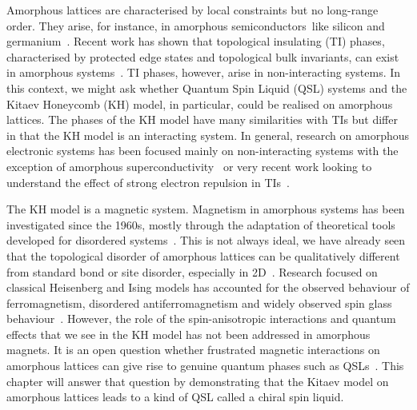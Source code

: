 Amorphous lattices are characterised by local constraints but no long-range order. They arise, for instance, in amorphous semiconductors~like silicon and germanium~\autocite{Yonezawa1983,zallen2008physics}. Recent work has shown that topological insulating (TI) phases, characterised by protected edge states and topological bulk invariants, can exist in amorphous systems~\autocite{mitchellAmorphousTopologicalInsulators2018,agarwala2019topological,marsalTopologicalWeaireThorpeModels2020,costa2019toward,agarwala2020higher,spring2021amorphous,corbae2019evidence}. TI phases, however, arise in non-interacting systems. In this context, we might ask whether Quantum Spin Liquid (QSL) systems and the Kitaev Honeycomb (KH) model, in particular, could be realised on amorphous lattices. The phases of the KH model have many similarities with TIs but differ in that the KH model is an interacting system. In general, research on amorphous electronic systems has been focused mainly on non-interacting systems with the exception of amorphous superconductivity~\autocite{buckel1954einfluss,mcmillan1981electron,meisel1981eliashberg,bergmann1976amorphous,mannaNoncrystallineTopologicalSuperconductors2022} or very recent work looking to understand the effect of strong electron repulsion in TIs~\autocite{kim2022fractionalization}.

The KH model is a magnetic system. Magnetism in amorphous systems has been investigated since the 1960s, mostly through the adaptation of theoretical tools developed for disordered systems~\autocite{aharony1975critical,Petrakovski1981,kaneyoshi1992introduction,Kaneyoshi2018}. This is not always ideal, we have already seen that the topological disorder of amorphous lattices can be qualitatively different from standard bond or site disorder, especially in 2D~\autocite{barghathiPhaseTransitionsRandom2014,schrauthViolationHarrisBarghathiVojtaCriterion2018}. Research focused on classical Heisenberg and Ising models has accounted for the observed behaviour of ferromagnetism, disordered antiferromagnetism and widely observed spin glass behaviour~\autocite{coey1978amorphous}. However, the role of the spin-anisotropic interactions and quantum effects that we see in the KH model has not been addressed in amorphous magnets. It is an open question whether frustrated magnetic interactions on amorphous lattices can give rise to genuine quantum phases such as QSLs~\autocite{Anderson1973,Knolle2019,Savary2016,Lacroix2011}. This chapter will answer that question by demonstrating that the Kitaev model on amorphous lattices leads to a kind of QSL called a chiral spin liquid.

